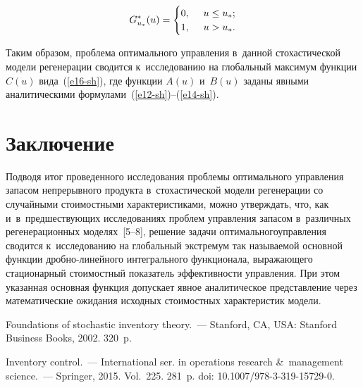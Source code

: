 \begin{multicols}{2}
\noindent
\begin{equation*}
    G^\ast_{u_\ast}(u)=
    \begin{cases}0,&\enskip u\leq u_\ast;\\
    1,&\enskip 
u>u_\ast.\end{cases}
\end{equation*}

Таким образом, проблема оптимального управ\-ле\-ния в~данной стохастической модели 
регенерации сводится к~исследованию на глобальный максимум функции $C(u)$ вида~(\ref{e16-sh}), 
где функции $A(u)$ и~$B(u)$ заданы явными аналитическими формулами~(\ref{e12-sh})--(\ref{e14-sh}).

\vspace*{-6pt}

\section{Заключение}

Подводя итог проведенного исследования проб\-ле\-мы оптимального управления запасом 
непрерывного продукта в~стохастической модели регенерации со случайными 
стоимостными \mbox{характеристиками}, мож\-но утверж\-дать, что, как и~в~пред\-шест\-ву\-ющих 
исследованиях проб\-лем управ\-ле\-ния запасом в~различных регенерационных моделях~[5--8], 
решение задачи оптимального\linebreak управ\-ле\-ния сводится к~исследованию на 
глобальный экстремум так на\-зы\-ва\-емой основной функции дроб\-но-ли\-ней\-но\-го 
интегрального функционала, вы\-ра\-жа\-юще\-го стационарный стоимостный \mbox{показатель} 
эф\-фек\-тив\-ности управ\-ле\-ния. При этом указанная основная функция допускает явное 
аналитическое пред\-став\-ле\-ние через математические ожидания исходных стоимостных 
характеристик модели.

\vspace*{-6pt}


{\small\frenchspacing
 {\baselineskip=10.5pt
 \begin{thebibliography}{99}


 Foundations of stochastic inventory 
theory.~--- Stanford, CA, USA: Stanford Business Books, 2002. 320~p.

 Inventory control.~---   International ser. 
in operations research \&~management science.~--- Springer, 2015. Vol.~225. 281~p.
doi: 10.1007/978-3-319-15729-0.


\end{thebibliography}}}
\end{multicols}
